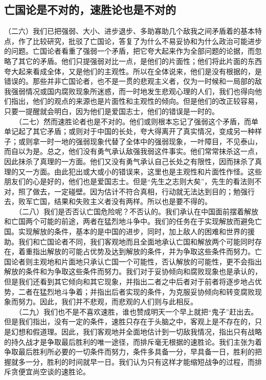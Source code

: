 \documentclass[cn,11pt,chinese]{elegantbook}
\def\myformat#1{\hfil\hfil #1}
\begin{document}
\subsection*{\myformat{亡国论是不对的，速胜论也是不对的}}
（二六）我们已把强弱、大小、进步退步、多助寡助几个敌我之间矛盾着的基本特点，作了比较研究，批驳了亡国论，答复了为什么不易妥协和为什么政治可能进步的问题。亡国论者看重了强弱一个矛盾，把它夸大起来作为全部问题的论据，而忽略了其它的矛盾。他们只提强弱对比一点，是他们的片面性；他们将此片面的东西夸大起来看成全体，又是他们的主观性。所以在全体说来，他们是没有根据的，是错误的。那些并非亡国论者，也不是一贯的悲观主义者，仅为一时候和一局部的敌我强弱情况或国内腐败现象所迷惑，而一时地发生悲观心理的人们，我们也得向他们指出，他们的观点的来源也是片面性和主观性的倾向。但是他们的改正较容易，只要一提醒就会明白，因为他们是爱国志士，他们的错误是一时的。\\
　　（二七）然而速胜论者也是不对的。他们或则根本忘记了强弱这个矛盾，而单单记起了其它矛盾；或则对于中国的长处，夸大得离开了真实情况，变成另一种样子；或则拿一时一地的强弱现象代替了全体中的强弱现象，一叶障目，不见泰山，而自以为是。总之，他们没有勇气承认敌强我弱这件事实。他们常常抹杀这一点，因此抹杀了真理的一方面。他们又没有勇气承认自己长处之有限性，因而抹杀了真理的又一方面。由此犯出或大或小的错误来，这里也是主观性和片面性作怪。这些朋友们的心是好的，他们也是爱国志士。但是“先生之志则大矣”，先生的看法则不对，照了做去，一定碰壁。因为估计不符合真相，行动就无法达到目的；勉强行去，败军亡国，结果和失败主义者没有两样。所以也是要不得的。\\
　　（二八）我们是否否认亡国危险呢？不否认的。我们承认在中国面前摆着解放和亡国两个可能的前途，两者在猛烈地斗争中。我们的任务在于实现解放而避免亡国。实现解放的条件，基本的是中国的进步，同时，加上敌人的困难和世界的援助。我们和亡国论者不同，我们客观地而且全面地承认亡国和解放两个可能同时存在，着重指出解放的可能占优势及达到解放的条件，并为争取这些条件而努力。亡国论者则主观地和片面地只承认亡国一个可能性，否认解放的可能性，更不会指出解放的条件和为争取这些条件而努力。我们对于妥协倾向和腐败现象也是承认的，但是我们还看到其它倾向和其它现象，并指出二者之中后者对于前者将逐步地占优势，二者在猛烈地斗争着；并指出后者实现的条件，为克服妥协倾向和转变腐败现象而努力。因此，我们并不悲观，而悲观的人们则与此相反。\\
　　（二九）我们也不是不喜欢速胜，谁也赞成明天一个早上就把“鬼子”赶出去。但是我们指出，没有一定的条件，速胜只存在于头脑之中，客观上是不存在的，只是幻想和假道理。因此，我们客观地并全面地估计到一切敌我情况，指出只有战略的持久战才是争取最后胜利的唯一途径，而排斥毫无根据的速胜论。我们主张为着争取最后胜利所必要的一切条件而努力，条件多具备一分，早具备一日，胜利的把握就多一分，胜利的时间就早一日。我们认为只有这样才能缩短战争的过程，而排斥贪便宜尚空谈的速胜论。\\
\end{document}
